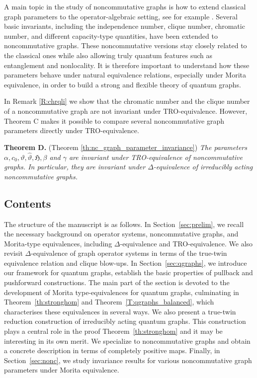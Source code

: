 \documentclass[11pt]{amsart}
\numberwithin{equation}{section}
\theoremstyle{plain}
\theoremstyle{definition}
\theoremstyle{remark}
\def\ga{\gamma}
\def\De{\Delta}
\newcommand{\fH}{{\mathfrak{H}}}
\newcommand{\wh}{\widehat}
\begin{document}
\medskip

A main topic in the study of noncommutative graphs is how to extend classical graph parameters to the operator-algebraic setting, see for example \cite{BTW21,DSW13,GL20,LPT18}. Several basic invariants, including the independence number, clique number, chromatic number, and different capacity-type quantities, have been extended to noncommutative graphs. These noncommutative versions stay closely related to the classical ones while also allowing truly quantum features such as entanglement and nonlocality. It is therefore important to understand how these parameters behave under natural equivalence relations, especially under Morita equivalence, in order to build a strong and flexible theory of quantum graphs.

In Remark \ref{R:chrqli} we show that the chromatic number and the clique number of a noncommutative graph are not invariant under TRO-equivalence.
However, Theorem C makes it possible to compare several noncommutative graph parameters directly under TRO-equivalence.

\medskip

\noindent
{\bf Theorem D.} (Theorem \ref{th:nc_graph_parameter_invariance})
{\it The parameters $\alpha, c_{0}, \vartheta, \wh{\vartheta}, \fH, \beta$ and $\ga$ are invariant under TRO-equivalence of noncommutative graphs. In particular, they are invariant under $\Delta$-equivalence of irreducibly acting noncommutative graphs.
}

\medskip

\subsection{Contents}
The structure of the manuscript is as follows. In Section~\ref{sec:prelim}, we recall the necessary background on operator systems, noncommutative graphs, and Morita-type equivalences, including $\Delta$-equivalence and TRO-equivalence. We also revisit $\De$-equivalence of graph operator systems in terms of the true-twin equivalence relation and clique blow-ups. In Section~\ref{sec:qgraphs}, we introduce our framework for quantum graphs, establish the basic properties of pullback and pushforward constructions. The main part of the section is devoted to the development of Morita type-equivalences for quantum graphs, culminating in Theorem~\ref{th:stronghom} and Theorem~\ref{T:qgraphs_balanced}, which characterises these equivalences in several ways. We also present a true-twin reduction construction of irreducibly acting quantum graphs. This construction plays a central role in the proof Theorem~\ref{th:stronghom} and it may be interesting in its own merit. We specialize to noncommutative graphs and obtain a concrete description in terms of completely positive maps. Finally, in Section~\ref{sec:nonc}, we study invariance results for various noncommutative graph parameters under Morita equivalence.
\end{document}
